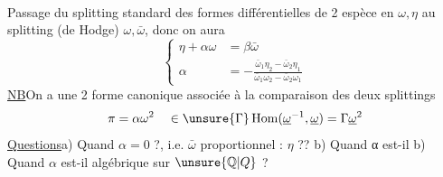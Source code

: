 Passage du splitting standard des formes différentielles de 2\textsuperscript{} espèce en $\omega,\eta$ au splitting  (de Hodge) $\omega,\bar\omega$, donc on aura
\[
\left\{\begin{aligned}
\eta+\alpha\omega&=\beta\bar{\omega}\\
\alpha&=-\frac{\bar{\omega}_1\eta_2-\bar{\omega}_2\eta_1}
{\bar{\omega}_1\omega_2-\bar{\omega}_2\omega_1}
\end{aligned}\right.
\]
\uline{NB}\quad On a une 2 forme  canonique associée à la comparaison des deux splittings
\[
\pi=\alpha\omega^2\quad\in\unsure{\Gamma}\operatorname{Hom}(\underline\omega^{-1},\underline\omega)=\Gamma\underline\omega^2
\]
\uline{Questions}\qquad a) Quand $\alpha=0$ ?, i.e. $\bar\omega$ proportionnel : $\eta$ ??
b) Quand α est-il
b) Quand $\alpha$ est-il algébrique sur $\unsure{\mathbb Q|Q}$ ?

